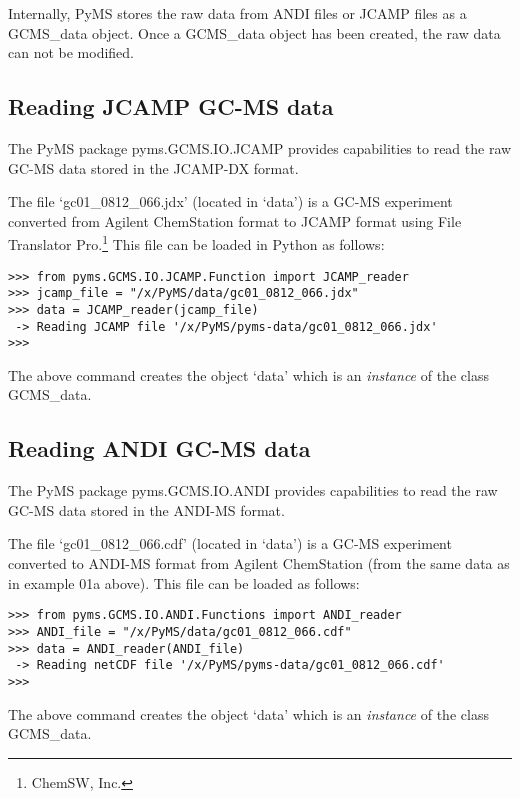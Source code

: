 Internally, PyMS stores the raw data from ANDI files or JCAMP files as a
GCMS\_data object. Once a GCMS\_data object has been created, the raw data
can not be modified.

\subsection{Reading JCAMP GC-MS data}


The PyMS package pyms.GCMS.IO.JCAMP provides capabilities to read the raw
GC-MS data stored in the JCAMP-DX format.

The file `gc01\_0812\_066.jdx' (located in `data') is a GC-MS experiment
converted from Agilent ChemStation format to JCAMP format using File
Translator Pro.\footnote{ChemSW, Inc.} This file can be loaded in Python
as follows:

\begin{verbatim}
>>> from pyms.GCMS.IO.JCAMP.Function import JCAMP_reader
>>> jcamp_file = "/x/PyMS/data/gc01_0812_066.jdx"
>>> data = JCAMP_reader(jcamp_file)
 -> Reading JCAMP file '/x/PyMS/pyms-data/gc01_0812_066.jdx'
>>>
\end{verbatim}

\noindent
The above command creates the object `data' which is an {\em instance}
of the class GCMS\_data.

\subsection{Reading ANDI GC-MS data}


The PyMS package pyms.GCMS.IO.ANDI provides capabilities to read the raw
GC-MS data stored in the ANDI-MS format.

The file `gc01\_0812\_066.cdf' (located in `data') is a GC-MS experiment
converted to ANDI-MS format from Agilent ChemStation (from the same data as in
example 01a above). This file can be loaded as follows:

\begin{verbatim}
>>> from pyms.GCMS.IO.ANDI.Functions import ANDI_reader
>>> ANDI_file = "/x/PyMS/data/gc01_0812_066.cdf"
>>> data = ANDI_reader(ANDI_file)
 -> Reading netCDF file '/x/PyMS/pyms-data/gc01_0812_066.cdf'
>>>
\end{verbatim}

\noindent
The above command creates the object `data' which is an {\em instance}
of the class GCMS\_data.

